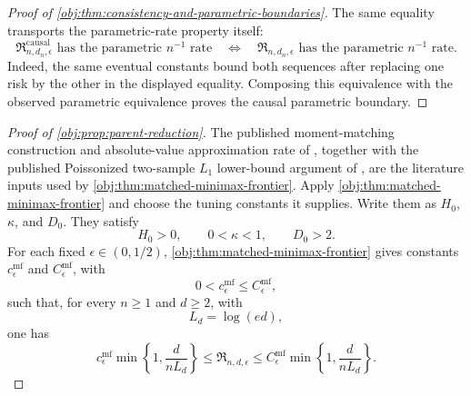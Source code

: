 \begin{proof}[Proof of \cref{obj:thm:consistency-and-parametric-boundaries}]
The same equality transports the parametric-rate property itself:
\[
\mathfrak R^{\mathrm{causal}}_{n,d_n,\epsilon}
\text{ has the parametric }n^{-1}\text{ rate}
\quad\Longleftrightarrow\quad
\mathfrak R_{n,d_n,\epsilon}
\text{ has the parametric }n^{-1}\text{ rate}.
\]
Indeed, the same eventual constants bound both sequences after replacing one risk by the other in the displayed equality.  Composing this equivalence with the observed parametric equivalence proves the causal parametric boundary. %
\end{proof}

\begin{proof}[Proof of \cref{obj:prop:parent-reduction}]
The published moment-matching construction and absolute-value approximation rate of
\citep[Lemma 1 and Section 3.1]{CaiLow2011L1}, together with the published Poissonized two-sample
\(L_1\) lower-bound argument of \citep[Theorem 3 and equation (24)]{JiaoHanWeissman2018L1},
are the literature inputs used by \cref{obj:thm:matched-minimax-frontier}. Apply
\cref{obj:thm:matched-minimax-frontier} and choose the tuning constants it supplies. Write them as
\(H_0\), \(\kappa\), and \(D_0\). They satisfy
\[
H_0>0,\qquad 0<\kappa<1,\qquad D_0>2 .
\]
For each fixed \(\epsilon\in(0,1/2)\), \cref{obj:thm:matched-minimax-frontier} gives constants
\(c_\epsilon^{\mathrm{mf}}\) and \(C_\epsilon^{\mathrm{mf}}\), with
\[
0<c_\epsilon^{\mathrm{mf}}\le C_\epsilon^{\mathrm{mf}},
\]
such that, for every \(n\ge1\) and \(d\ge2\), with
\[
L_d=\log(ed),
\]
one has
\[
c_\epsilon^{\mathrm{mf}}
\min\left\{1,\frac{d}{nL_d}\right\}
\le
\mathfrak R_{n,d,\epsilon}
\le
C_\epsilon^{\mathrm{mf}}
\min\left\{1,\frac{d}{nL_d}\right\}.
\]


\end{proof}
